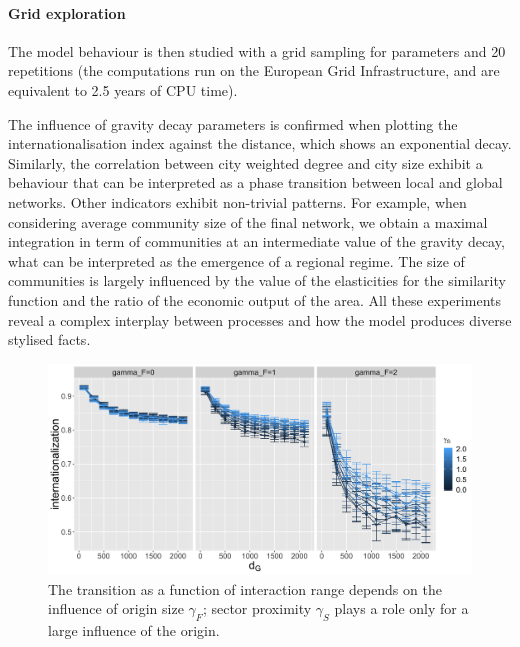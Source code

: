 \documentclass[11pt]{article}
\begin{document}
\paragraph{Grid exploration}

The model behaviour is then studied with a grid sampling for parameters and 20 repetitions (the computations run on the European Grid Infrastructure, and are equivalent to 2.5 years of CPU time).

The influence of gravity decay parameters is confirmed when plotting the internationalisation index against the distance, which shows an exponential decay. Similarly, the correlation between city weighted degree and city size exhibit a behaviour that can be interpreted as a phase transition between local and global networks. Other indicators exhibit non-trivial patterns. For example, when considering average community size of the final network, we obtain a maximal integration in term of communities at an intermediate value of the gravity decay, what can be interpreted as the emergence of a regional regime. The size of communities is largely influenced by the value of the elasticities for the similarity function and the ratio of the economic output of the area. All these experiments reveal a complex interplay between processes and how the model produces diverse stylised facts.

\begin{figure}
    \includegraphics[width=\textwidth]{figures/internationalization_countryGravityDecay200_gammaDestination0_facetwrapgammaOrigin_colorgammaSectors.png}
    \caption{The transition as a function of interaction range depends on the influence of origin size $\gamma_F$; sector proximity $\gamma_S$ plays a role only for a large influence of the origin.}
\end{figure}
\end{document}
